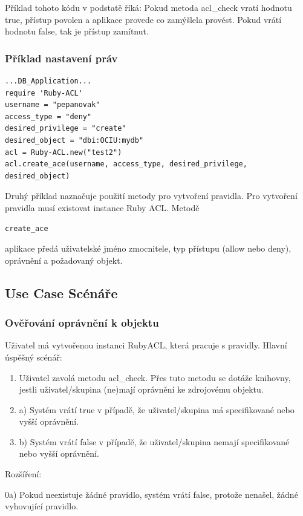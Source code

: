 \documentclass[11pt,twoside,a4paper]{book}
\begin{document}
Příklad tohoto kódu v podstatě říká: Pokud metoda acl\_check vratí hodnotu true, přístup povolen a aplikace provede co zamýšlela provést. Pokud vrátí hodnotu false, tak je přístup zamítnut.

\subsubsection{Příklad nastavení práv}

\begin{verbatim}
...DB_Application...
require 'Ruby-ACL'
username = "pepanovak"
access_type = "deny"
desired_privilege = "create"
desired_object = "dbi:OCIU:mydb"
acl = Ruby-ACL.new("test2")
acl.create_ace(username, access_type, desired_privilege, desired_object)
\end{verbatim}

Druhý příklad naznačuje použití metody pro vytvoření pravidla. Pro vytvoření pravidla musí existovat instance Ruby ACL. Metodě \begin{verbatim}create_ace\end{verbatim} aplikace předá uživatelské jméno zmocnitele, typ přístupu (allow nebo deny), oprávnění a požadovaný objekt.

\subsection{Use Case Scénáře}
\subsubsection{Ověřování oprávnění k objektu}
Uživatel má vytvořenou instanci RubyACL, která pracuje s pravidly.
Hlavní úspěšný scénář:
\begin{enumerate}
\item Uživatel zavolá metodu acl\_check. Přes tuto metodu se dotáže knihovny, jestli uživatel/skupina (ne)mají oprávnění ke zdrojovému objektu.
\item a) Systém vrátí true v případě, že uživatel/skupina má specifikované nebo vyšší oprávnění.
\item b) Systém vrátí false v případě, že uživatel/skupina nemají specifikované nebo vyšší oprávnění.
\end{enumerate}
Rozšíření:

0a) Pokud neexistuje žádné pravidlo, systém vrátí false, protože nenašel, žádné vyhovující pravidlo.
\end{document}
